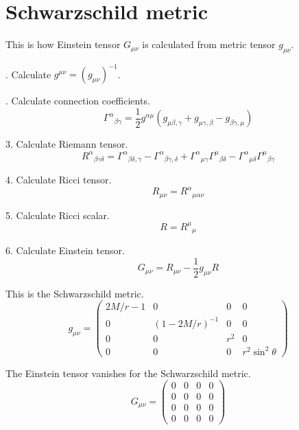 

\section*{Schwarzschild metric}

This is how Einstein tensor $G_{\mu\nu}$ is calculated from metric tensor $g_{\mu\nu}$.

. Calculate $g^{\mu\nu}=(g_{\mu\nu})^{-1}$.

. Calculate connection coefficients.
\begin{equation*}
\Gamma^\alpha{}_{\beta\gamma}=\frac{1}{2}
g^{\alpha\mu}(g_{\mu\beta,\gamma}+g_{\mu\gamma,\beta}-g_{\beta\gamma,\mu})
\end{equation*}

3. Calculate Riemann tensor.
\begin{equation*}
R^\alpha{}_{\beta\gamma\delta}
=\Gamma^\alpha{}_{\beta\delta,\gamma}
-\Gamma^\alpha{}_{\beta\gamma,\delta}
+\Gamma^\alpha{}_{\mu\gamma}\Gamma^\mu{}_{\beta\delta}
-\Gamma^\alpha{}_{\mu\delta}\Gamma^\mu{}_{\beta\gamma}
\end{equation*}

4. Calculate Ricci tensor.
\begin{equation*}
R_{\mu\nu}=R^\alpha{}_{\mu\alpha\nu}
\end{equation*}

5. Calculate Ricci scalar.
\begin{equation*}
R=R^\mu{}_\mu
\end{equation*}

6. Calculate Einstein tensor.
\begin{equation*}
G_{\mu\nu}=R_{\mu\nu}-\frac{1}{2}g_{\mu\nu}R
\end{equation*}

This is the Schwarzschild metric.
\begin{equation*}
g_{\mu\nu}=\begin{pmatrix}
2M/r-1 & 0 & 0 & 0
\\
0 & (1 - 2M/r)^{-1} & 0 & 0
\\
0 & 0 & r^2 & 0
\\
0 & 0 & 0 & r^2\sin^2\theta
\end{pmatrix}
\end{equation*}

The Einstein tensor vanishes for the Schwarzschild metric.
\begin{equation*}
G_{\mu\nu}=\begin{pmatrix}
0 & 0 & 0 & 0
\\
0 & 0 & 0 & 0
\\
0 & 0 & 0 & 0
\\
0 & 0 & 0 & 0
\end{pmatrix}
\end{equation*}


